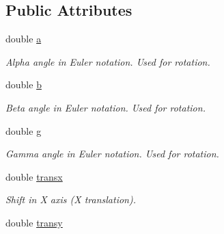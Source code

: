 \subsection*{Public Attributes}
\begin{DoxyCompactItemize}
\item 
\hypertarget{classRAND_a557936392d1015fba66f90e8bfec44f7}{
double \hyperlink{classRAND_a557936392d1015fba66f90e8bfec44f7}{a}}
\label{classRAND_a557936392d1015fba66f90e8bfec44f7}

\begin{DoxyCompactList}\small\item\em Alpha angle in Euler notation. Used for rotation. \item\end{DoxyCompactList}\item 
\hypertarget{classRAND_a97c13fcebe0f7c48dc302f1e4f2b185a}{
double \hyperlink{classRAND_a97c13fcebe0f7c48dc302f1e4f2b185a}{b}}
\label{classRAND_a97c13fcebe0f7c48dc302f1e4f2b185a}

\begin{DoxyCompactList}\small\item\em Beta angle in Euler notation. Used for rotation. \item\end{DoxyCompactList}\item 
\hypertarget{classRAND_a14feefca7aa9bcdb172ad9a08615e61a}{
double \hyperlink{classRAND_a14feefca7aa9bcdb172ad9a08615e61a}{g}}
\label{classRAND_a14feefca7aa9bcdb172ad9a08615e61a}

\begin{DoxyCompactList}\small\item\em Gamma angle in Euler notation. Used for rotation. \item\end{DoxyCompactList}\item 
\hypertarget{classRAND_a6f52b35b492baeca117ceb9c1058bff5}{
double \hyperlink{classRAND_a6f52b35b492baeca117ceb9c1058bff5}{transx}}
\label{classRAND_a6f52b35b492baeca117ceb9c1058bff5}

\begin{DoxyCompactList}\small\item\em Shift in X axis (X translation). \item\end{DoxyCompactList}\item 
\hypertarget{classRAND_a40de157be448ff7e0a9a82caf10f2f5e}{
double \hyperlink{classRAND_a40de157be448ff7e0a9a82caf10f2f5e}{transy}}
\label{classRAND_a40de157be448ff7e0a9a82caf10f2f5e}


\end{DoxyCompactItemize}

